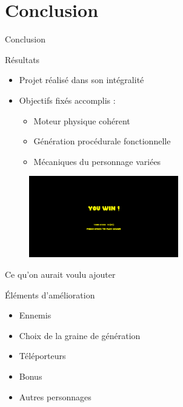 \documentclass{beamer}
\begin{document}
{\section{Conclusion}
\begin{frame}{Conclusion}
    \begin{block}{R\'esultats}
        \begin{itemize}
            \item[\bullet] Projet réalisé dans son intégralité
            \item[\bullet] Objectifs fixés accomplis :
            \begin{itemize}
                \item[\rightarrow] Moteur physique cohérent
                \item[\rightarrow] Génération procédurale fonctionnelle
                \item[\rightarrow] Mécaniques du personnage variées
            \end{itemize}   
        \end{itemize}
    \end{block}
    \begin{figure}
        \centering
        \includegraphics[width=0.58\textwidth]{images/end.png}
    \end{figure}
\end{frame}

\begin{frame}{Ce qu'on aurait voulu ajouter}
    \begin{block}{Éléments d'amélioration}
        \begin{itemize}
          \item[\bullet] Ennemis
          \item[\bullet] Choix de la graine de génération
          \item[\bullet] Téléporteurs
          \item[\bullet] Bonus
          \item[\bullet] Autres personnages
        \end{itemize}
    \end{block}
\end{frame}

}
\end{document}
